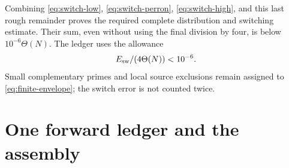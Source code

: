 \documentclass[11pt]{article}
\theoremstyle{definition}
\newcommand{\Th}{\Theta(N)}
\begin{document}
Combining \eqref{eq:switch-low}, \eqref{eq:switch-perron},
\eqref{eq:switch-high}, and this last rough remainder proves the
required complete distribution and switching estimate.  Their sum,
even without using the final division by four, is below
$10^{-6}\Th$.  The ledger uses the allowance
\begin{equation}\label{eq:switch-cost}
 E_{\rm sw}/(4\Th)<10^{-6}.
\end{equation}
Small complementary primes and local source exclusions remain assigned
to \eqref{eq:finite-envelope}; the switch error is not counted twice.

\section{One forward ledger and the assembly}\label{sec:assembly}
\end{document}
